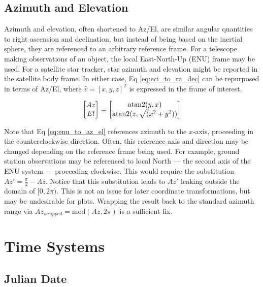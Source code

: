 \subsection{Azimuth and Elevation}

Azimuth and elevation, often shortened to Az/El, are similar angular quantities to right ascension and declination, but instead of being based on
the inertial sphere, they are referenced to an arbitrary reference frame. For a telescope making
observations of an object, the local East-North-Up (ENU) frame may be used. For a satellite star
tracker, star azimuth and elevation might be reported in the satellite body frame. In either case,
Eq \ref{eq:eci_to_ra_dec} can be repurposed in terms of Az/El, where $\hat{v} = \left[ x, y, z
\right]^T$ is expressed in the frame of interest.

\begin{equation} \label{eq:enu_to_az_el}
  \begin{bmatrix}
	Az \\
	El
  \end{bmatrix} = 
  \begin{bmatrix}
	\operatorname{atan2}(y, x) \\
	\operatorname{atan2}(z, \sqrt(x^2 + y^2))
  \end{bmatrix}
\end{equation}

Note that Eq \ref{eq:enu_to_az_el} references azimuth to the $x$-axis, proceeding in the
counterclockwise direction. Often, this reference axis and direction may be changed depending on the
reference frame being used. For example, ground station observations may be referenced to local
North ---  the second axis of the ENU system ---  proceeding clockwise. This would require the
substitution $Az' = \frac{\pi}{2} - Az$. Notice that this substitution leads to $Az'$ leaking
outside the domain of $[0, 2\pi)$. This is not an issue for later coordinate transformations, but
may be undesirable for plots. Wrapping the result back to the standard azimuth range via
$Az_{wrapped} = \textrm{mod}(Az, 2\pi)$ is a sufficient fix.

\section{Time Systems}

\subsection{Julian Date}

